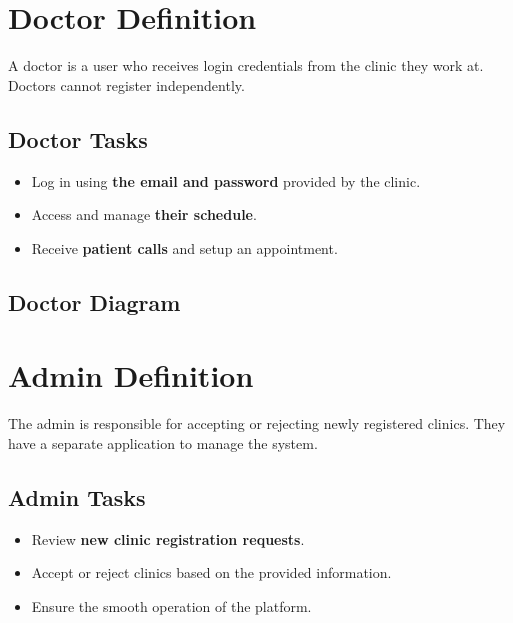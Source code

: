 \documentclass{article}
\begin{document}
\section{Doctor Definition}
A doctor is a user who receives login credentials from the clinic they work at. Doctors cannot register independently.

\subsection{Doctor Tasks}
\begin{itemize}
    \item Log in using \textbf{the email and password} provided by the clinic.
    \item Access and manage \textbf{their schedule}.
    \item Receive \textbf{patient calls} and setup an appointment.
\end{itemize}


\subsection{Doctor Diagram}

\begin{center}
\end{center}
\section{Admin Definition}
The admin is responsible for accepting or rejecting newly registered clinics. They have a separate application to manage the system.

\subsection{Admin Tasks}
\begin{itemize}
    \item Review \textbf{new clinic registration requests}.
    \item Accept or reject clinics based on the provided information.
    \item Ensure the smooth operation of the platform.
\end{itemize}
\end{document}
